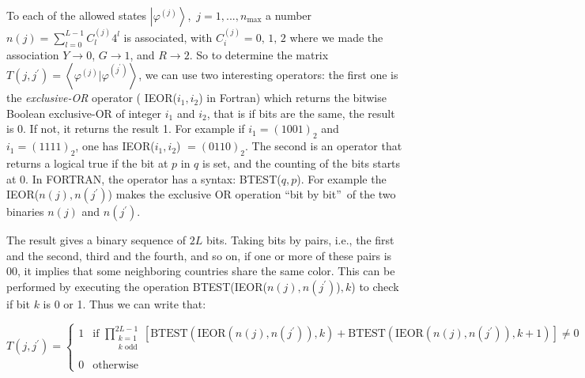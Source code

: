 \documentclass[3p, 10pt, onecolumn]{elsarticle}
\begin{document}
To each of the allowed states $\left\vert \varphi ^{(j)}\right\rangle $,\ $%
j=1,...,n_{\max }$ a number $n(j)=\sum_{l=0}^{L-1}C_{l}^{(j)}4^{l}$ is
associated, with $C_{i}^{(j)}=0,\,1,\,2$ where we made the association $%
Y\rightarrow 0$, $G\rightarrow 1$, and $R\rightarrow 2$. So to determine the
matrix $T(j,j^{\prime })=\left\langle \varphi ^{(j)}|\varphi ^{(j^{\prime
})}\right\rangle $, we can use two interesting operators: the first one is
the \textit{exclusive-OR} operator ( IEOR($i_{1},i_{2}$) in Fortran) which
returns the bitwise Boolean exclusive-OR of integer $i_{1}$ and $i_{2}$,
that is if bits are the same, the result is 0. If not, it returns the result
1. For example if $i_{1}=(1001)_{2}$ and $i_{1}=(1111)_{2}$, one has IEOR($%
i_{1},i_{2}$) $=(0110)_{2}$. The second is an operator that returns a
logical true if the bit at $p$ in $q$ is set, and the counting of the bits
starts at 0. In FORTRAN, the operator has a syntax: BTEST($q,p$). For
example the IEOR($n(j),n(j^{\prime })$) makes the exclusive OR operation
\textquotedblleft bit by bit\textquotedblright\ of the two binaries $n(j)$
and $n(j^{\prime })$.

The result gives a binary sequence of $2L$ bits. Taking bits by pairs, i.e.,
the first and the second, third and the fourth, and so on, if one or more of
these pairs is 00, it implies that some neighboring countries share the same
color. This can be performed by executing the operation BTEST(IEOR($%
n(j),n(j^{\prime })$)$,k$) to check if bit $k$ is 0 or 1. Thus we can write
that:

\begin{equation}
T(j,j^{\prime })=\left\{ 
\begin{array}{ll}
1 & \text{if\ }\prod\limits_{\substack{ k=1  \\ k\text{ odd}}}^{2L-1}\left[ 
\text{BTEST}(\text{IEOR}(n(j),n(j^{\prime })),k)+\text{BTEST}(\text{IEOR}%
(n(j),n(j^{\prime })),k+1)\right] \neq 0 \\ 
&  \\ 
0 & \text{otherwise}%
\end{array}%
\right.  \label{Eq:T}
\end{equation}
\end{document}
